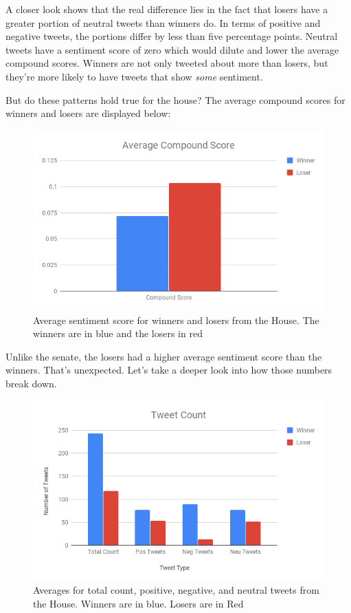 \documentclass[11pt, twoside, reqno]{book}
\begin{document}
A closer look shows that the real difference lies in the fact that losers have a greater portion of neutral tweets than winners do. In terms of positive and negative tweets, the portions differ by less than five percentage points. Neutral tweets have a sentiment score of zero which would dilute and lower the average compound scores. Winners are not only tweeted about more than losers, but they're more likely to have tweets that show \textit{some} sentiment.

But do these patterns hold true for the house? The average compound scores for winners and losers are displayed below:

\begin{figure}[H]
\centering
	\includegraphics[scale=0.5]{house_compound}
	\caption{Average sentiment score for winners and losers from the House. The winners are in blue and the losers in red}\label{fig:house_compound}
\end{figure}

Unlike the senate, the losers had a higher average sentiment score than the winners. That's unexpected. Let's take a deeper look into how those numbers break down. 

\begin{figure}[H]
\centering
	\includegraphics[scale=0.5]{house_tweet_type}
	\caption{Averages for total count, positive, negative, and neutral tweets from the House. Winners are in blue. Losers are in Red}\label{fig:house_tweet_type}

\end{figure}
\end{document}
